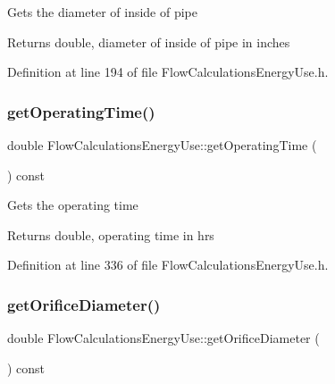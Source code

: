 Gets the diameter of inside of pipe

\begin{DoxyReturn}{Returns}
double, diameter of inside of pipe in inches 
\end{DoxyReturn}


Definition at line 194 of file Flow\+Calculations\+Energy\+Use.\+h.

\mbox{\label{class_flow_calculations_energy_use_ab44c6cad4825e30f5599f18fcbfbb873}} 
\subsubsection{\texorpdfstring{get\+Operating\+Time()}{getOperatingTime()}}
{\footnotesize\ttfamily double Flow\+Calculations\+Energy\+Use\+::get\+Operating\+Time (\begin{DoxyParamCaption}{ }\end{DoxyParamCaption}) const\hspace{0.3cm}{\ttfamily [inline]}}

Gets the operating time

\begin{DoxyReturn}{Returns}
double, operating time in hrs 
\end{DoxyReturn}


Definition at line 336 of file Flow\+Calculations\+Energy\+Use.\+h.

\mbox{\label{class_flow_calculations_energy_use_a71c34f09ec3524db321b8934930700c5}} 
\subsubsection{\texorpdfstring{get\+Orifice\+Diameter()}{getOrificeDiameter()}}
{\footnotesize\ttfamily double Flow\+Calculations\+Energy\+Use\+::get\+Orifice\+Diameter (\begin{DoxyParamCaption}{ }\end{DoxyParamCaption}) const\hspace{0.3cm}{\ttfamily [inline]}}

